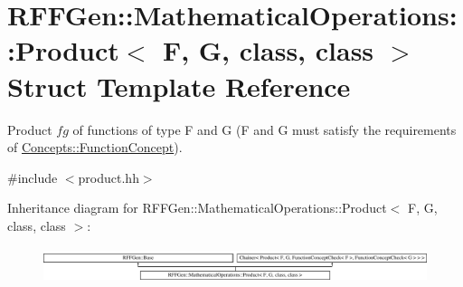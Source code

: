 \hypertarget{structRFFGen_1_1MathematicalOperations_1_1Product}{\section{R\-F\-F\-Gen\-:\-:Mathematical\-Operations\-:\-:Product$<$ F, G, class, class $>$ Struct Template Reference}
\label{structRFFGen_1_1MathematicalOperations_1_1Product}
}


Product $fg$ of functions of type F and G (F and G must satisfy the requirements of \hyperlink{structRFFGen_1_1Concepts_1_1FunctionConcept}{Concepts\-::\-Function\-Concept}).  




{\ttfamily \#include $<$product.\-hh$>$}

Inheritance diagram for R\-F\-F\-Gen\-:\-:Mathematical\-Operations\-:\-:Product$<$ F, G, class, class $>$\-:\begin{figure}[H]
\begin{center}
\leavevmode
\includegraphics[height=1.056604cm]{structRFFGen_1_1MathematicalOperations_1_1Product}
\end{center}
\end{figure}
